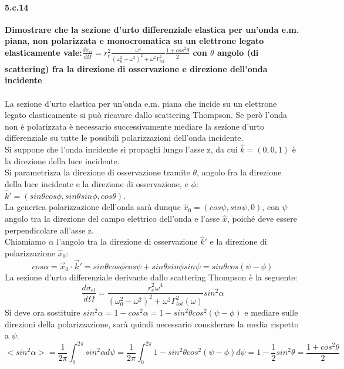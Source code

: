 \documentclass[twoside]{article}
\begin{document}
\paragraph{5.c.14}\textbf{Dimostrare che la sezione d’urto differenziale elastica per un’onda e.m. piana,
non polarizzata e monocromatica su un elettrone legato elasticamente vale:$\frac{d\sigma_{el}}{d\Omega}=r_e^2\frac{\omega^4}{(\omega_0^2-\omega^2)^2+\omega^2\Gamma_{tot}^2}\frac{1+cos^2\theta}{2}$ con $\theta$ angolo (di scattering) fra la direzione di osservazione e direzione dell'onda incidente}\\ \\
La sezione d'urto elastica per un'onda e.m. piana che incide su un elettrone legato elasticamente si può ricavare dallo scattering Thompson. Se però l'onda non è polarizzata è necessario successivamente mediare la sezione d'urto differenziale su tutte le possibili polarizzazioni dell'onda incidente. \\ 
Si suppone che l'onda incidente si propaghi lungo l'asse z, da cui $\hat{k}=(0,0,1)$ è la direzione della luce incidente.\\
Si parametrizza la direzione di osservazione tramite $\theta$, angolo fra la direzione della luce incidente e la direzione di osservazione, e $\phi$: $\hat{k}'=(sin\theta cos\phi, sin \theta sin\phi, cos\theta)$.\\
La generica polarizzazione dell'onda sarà dunque $\hat{x}_0=(cos\psi,sin\psi,0)$, con $\psi$ angolo tra la direzione del campo elettrico dell'onda e l'asse $\hat{x}$, poiché deve essere perpendicolare all'asse z.\\
Chiamiamo $\alpha$ l'angolo tra la direzione di osservazione $\hat{k}'$ e la direzione di polarizzazione $\hat{x}_0$:
\begin{equation}
    cos \alpha= \vec{x}_0 \cdot \vec{k}'= sin\theta cos\phi cos\psi+ sin\theta sin\phi sin\psi= sin\theta cos(\psi-\phi) 
\end{equation}
La sezione d'urto differenziale derivante dallo scattering Thompson è la seguente:
\begin{equation}\label{urto}
    \frac{d\sigma_{el}}{d\Omega}=\frac{r_e^2\omega^4}{(\omega_0^2-\omega^2)^2+\omega^2\Gamma^2_{tot}(\omega)}sin^2\alpha
\end{equation}
Si deve ora sostituire $sin^2\alpha=1-cos^2\alpha=1-sin^2\theta cos^2(\psi-\phi) $ e mediare sulle direzioni della polarizzazione, sarà quindi necessario considerare la media rispetto a $\psi$.
\begin{equation}\label{media}
    <sin^2\alpha>=\frac{1}{2\pi}\int_0^{2\pi} sin^2\alpha d\psi=\frac{1}{2\pi}\int_0^{2\pi}1-sin^2\theta cos^2(\psi-\phi) d\psi=1-\frac{1}{2}sin^2\theta=\frac{1+cos^2\theta}{2}
\end{equation}
\end{document}
